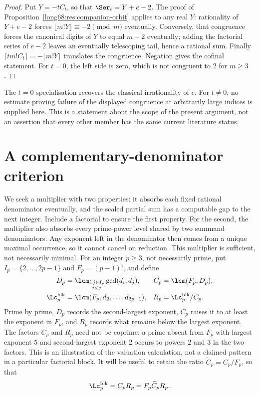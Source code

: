 \begin{proof}
Put $Y=-tC_t$, so that $\Ser_t=Y+e-2$.  The proof of
Proposition~\ref{long68:res:companion-orbit} applies to any real $Y$:
rationality of $Y+e-2$ forces
$\lfloor m!Y\rfloor\equiv-2\pmod m$ eventually.  Conversely, that congruence
forces the canonical digits of $Y$ to equal $m-2$ eventually; adding the
factorial series of $e-2$ leaves an eventually telescoping tail, hence a
rational sum.  Finally
$\lceil t m!C_t\rceil=-\lfloor m!Y\rfloor$ translates the congruence.
Negation gives the cofinal statement.  For $t=0$, the left side is zero,
which is not congruent to $2$ for $m\ge3$.
\end{proof}

The $t=0$ specialisation recovers the classical irrationality of $e$.
For $t\ne0$, no estimate proving failure of the displayed congruence at
arbitrarily large indices is supplied here.
This is a statement about the scope of the present argument, not an assertion
that every other member has the same current literature status.

\section{A complementary-denominator criterion}\label{long68:sec:residue}

We seek a multiplier with two properties: it absorbs each fixed
rational denominator eventually, and the scaled partial sum has a
computable gap to the next integer. Include a factorial to ensure the
first property. For the second, the multiplier also absorbs every prime-power
level shared by two summand denominators. Any exponent left in the
denominator then comes from a unique maximal occurrence, so it
cannot cancel on reduction. This multiplier
is sufficient, not necessarily minimal. For an integer $p\ge3$, not
necessarily prime, put
$I_p=\{2,\ldots,2p-1\}$ and $F_p=(p-1)!$, and define
\begin{align*}
 D_p&=\lcm_{\substack{i,j\in I_p\\ i<j}}\gcd(d_i,d_j),
 &C_p&=\lcm(F_p,D_p),\\
 \Lc^{\mathrm{blk}}_p&=\lcm(F_p,d_2,\ldots,d_{2p-1}),
 &R_p&=\Lc^{\mathrm{blk}}_p/C_p .
\end{align*}
Prime by prime, $D_p$ records the second-largest exponent, $C_p$
raises it to at least the exponent in $F_p$, and $R_p$ records what
remains below the largest exponent.
The factors $C_p$ and $R_p$ need not be coprime: a prime absent from $F_p$
with largest exponent $5$ and second-largest exponent $2$ occurs to powers
$2$ and $3$ in the two factors. This is an illustration of the valuation
calculation, not a claimed pattern in a particular factorial block.
It will be useful to retain the ratio $\widetilde C_p=C_p/F_p$, so that
\begin{equation}\label{long68:eq:core-normalisation}
 \Lc^{\mathrm{blk}}_p=C_pR_p=F_p\widetilde C_pR_p .
\end{equation}



